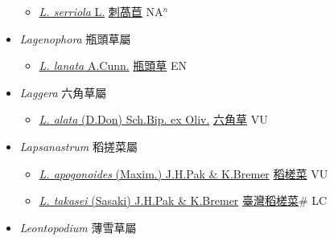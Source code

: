 \begin{itemize}
  \begin{itemize}
        \item[] \href{http://www.theplantlist.org/tpl1.1/search?q=Lactuca+serriola}{\textit{L. serriola} L.}   \href{\detokenize{http://taibnet.sinica.edu.tw/chi/taibnet_species_list.php?T2=刺萵苣&T2_new_value=true&fr=y}}{刺萵苣} NA$^n$
  \end{itemize}
 \item[] \textit{Lagenophora} 瓶頭草屬
                    
  \begin{itemize}
        \item[] \href{http://www.theplantlist.org/tpl1.1/search?q=Lagenophora+lanata}{\textit{L. lanata} A.Cunn.}   \href{\detokenize{http://taibnet.sinica.edu.tw/chi/taibnet_species_list.php?T2=瓶頭草&T2_new_value=true&fr=y}}{瓶頭草} EN
  \end{itemize}
 \item[] \textit{Laggera} 六角草屬
                    
  \begin{itemize}
        \item[] \href{http://www.theplantlist.org/tpl1.1/search?q=Laggera+alata}{\textit{L. alata} (D.Don) Sch.Bip. ex Oliv.}   \href{\detokenize{http://taibnet.sinica.edu.tw/chi/taibnet_species_list.php?T2=六角草&T2_new_value=true&fr=y}}{六角草} VU
  \end{itemize}
 \item[] \textit{Lapsanastrum} 稻搓菜屬
                    
  \begin{itemize}
        \item[] \href{http://www.theplantlist.org/tpl1.1/search?q=Lapsanastrum+apogonoides}{\textit{L. apogonoides} (Maxim.) J.H.Pak \& K.Bremer}   \href{\detokenize{http://taibnet.sinica.edu.tw/chi/taibnet_species_list.php?T2=稻槎菜&T2_new_value=true&fr=y}}{稻槎菜} VU
        \item[] \href{http://www.theplantlist.org/tpl1.1/search?q=Lapsanastrum+takasei}{\textit{L. takasei} (Sasaki) J.H.Pak \& K.Bremer}   \href{\detokenize{http://taibnet.sinica.edu.tw/chi/taibnet_species_list.php?T2=臺灣稻槎菜&T2_new_value=true&fr=y}}{臺灣稻槎菜}\# LC
  \end{itemize}
 \item[] \textit{Leontopodium} 薄雪草屬
                    

\end{itemize}
